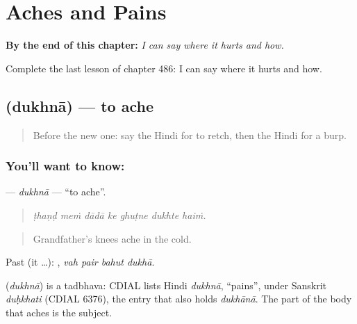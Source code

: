 
\chapter{Aches and Pains}
\label{ch:hi-aches-and-pains}

\begin{chapteropening}
\textbf{By the end of this chapter:} \emph{I can say where it hurts and how.}

Complete the last lesson of chapter 486: I can say where it hurts and how.
\end{chapteropening}

\section[\texorpdfstring{\hi{दुखना} (dukhnā)}{दुखना (dukhnā)}]{ (dukhnā) — to ache}

\label{lesson:HI-C486-dukhna}



\begin{quote}
Before the new one: say the Hindi for to retch, then the Hindi for a burp.
\end{quote}

\subsection*{You'll want to know: }
\textbf{} — \emph{dukhnā} — \textquotedblleft{}to ache\textquotedblright{}.

\begin{quote}
      
\end{quote}

\begin{quote}
\emph{ṭhaṇḍ meṁ dādā ke ghuṭne dukhte haiṁ.}
\end{quote}

\begin{quote}
Grandfather's knees ache in the cold.
\end{quote}

Past (it …):    , \emph{vah pair bahut dukhā}.

\begin{cousinweb}
\textbf{} (\emph{dukhnā}) is a tadbhava: CDIAL lists Hindi \emph{dukhnā}, \textquotedblleft{}pains\textquotedblright{}, under Sanskrit \emph{duḥkhati} (CDIAL 6376), the entry that also holds \emph{dukhānā}. The part of the body that aches is the subject.
\end{cousinweb}

